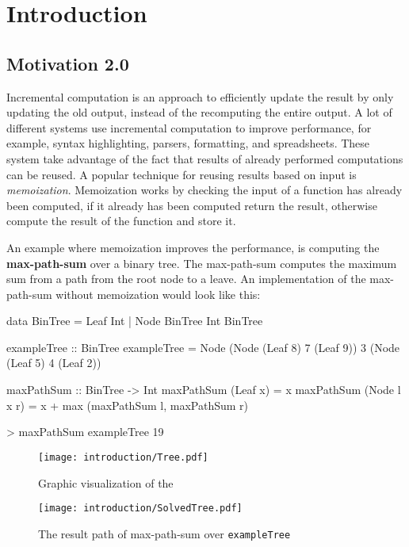 \chapter{Introduction}


\section{Motivation 2.0}
Incremental computation is an approach to efficiently update the result by only updating the old output, instead of the recomputing the entire output. A lot of different systems use incremental computation to improve performance, for example, syntax highlighting, parsers, formatting, and spreadsheets. These system take advantage of the fact that results of already performed computations can be reused. A popular technique for reusing results based on input is \textit{memoization}. Memoization works by checking the input of a function has already been computed, if it already has been computed return the result, otherwise compute the result of the function and store it. 

An example where memoization improves the performance, is computing the \textbf{max-path-sum} over a binary tree. The max-path-sum computes the maximum sum from a path from the root node to a leave. An implementation of the max-path-sum without memoization would look like this:

\begin{haskell}
data BinTree = Leaf Int
             | Node BinTree Int BinTree 
             
exampleTree :: BinTree    
exampleTree = Node (Node (Leaf 8) 7 (Leaf 9)) 3 (Node (Leaf 5) 4 (Leaf 2))

maxPathSum :: BinTree -> Int
maxPathSum (Leaf x)     = x
maxPathSum (Node l x r) = x + max (maxPathSum l, maxPathSum r)

> maxPathSum exampleTree
    19
\end{haskell}

\begin{figure}[H]
    \begin{minipage}[c]{0.45\textwidth}
        \centering
        \texttt{[image: introduction/Tree.pdf]}
        \caption{Graphic visualization of the }
    \end{minipage}
    \hspace{0.1\textwidth}
    \begin{minipage}[c]{0.45\textwidth}
        \centering
        \texttt{[image: introduction/SolvedTree.pdf]}
        \caption{The result path of max-path-sum over \texttt{exampleTree}}
    \end{minipage}
\end{figure}

